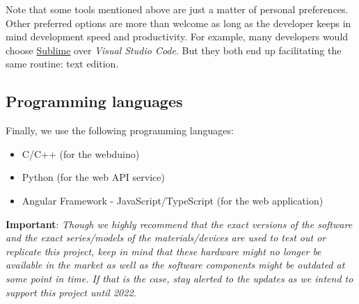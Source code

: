 \noindent
Note that some tools mentioned above are just a matter of personal preferences. Other preferred options are more than welcome as long as the developer keeps in mind development speed and productivity. For example, many developers would choose \href{https://www.sublimetext.com/}{Sublime} over \emph{Visual Studio Code}. But they both end up facilitating the same routine: text edition.

\subsection{Programming languages}
Finally, we use the following programming languages:
\begin{itemize}
    \item C/C++ (for the webduino)
    \item Python (for the web API service)
    \item Angular Framework - JavaScript/TypeScript (for the web application)
\end{itemize}

\noindent
\textbf{Important}: \textit{Though we highly recommend that the exact versions of the software and the exact series/models of the materials/devices are used to test out or replicate this project, keep in mind that these hardware might no longer be available in the market as well as the software components might be outdated at some point in time. If that is the case, stay alerted to the updates as we intend to support this project until 2022.}

